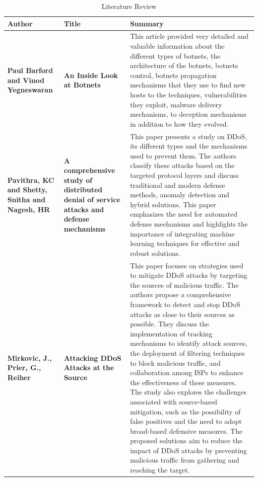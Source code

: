 \documentclass[a4paper, 12pt]{report} %
\begin{document}
            \begin{spacing}{1}
                \begin{table}
                    \centering
                    \label{tab:litterature_review}
                    \caption{Literature Review}
                    \begin{tabularx}{\linewidth}{|p{2cm}|p{3cm}|X|}
                        \hline
                        \textbf{Author} & \textbf{Title} & \textbf{Summary} \\
                        \hline
                        \textbf{Paul Barford and Vinod Yegneswaran} & \textbf{An Inside Look at Botnets} \cite{10.1007/978-0-387-44599-1_8} & This article provided very detailed and valuable information about the different types of botnets, the architecture of the botnets, botnets control, botnets propagation mechanisms that they use to find new hosts to the techniques, vulnerabilities they exploit, malware delivery mechanisms, to deception mechanisms in addition to how they evolved.\\
                        \hline
                        \textbf{Pavithra, KC and Shetty, Snitha and Nagesh, HR} & \textbf{A comprehensive study of distributed denial of service attacks and defense mechanisms} \cite{pavithra2014comprehensive} & This paper presents a study on DDoS, its different types and the mechanisms used to prevent them. The authors classify these attacks based on the targeted protocol layers and discuss traditional and modern defense methods, anomaly detection and hybrid solutions. This paper emphasizes the need for automated defense mechanisms and highlights the importance of integrating machine learning techniques for effective and robust solutions. \\
                        \hline
                        \textbf{Mirkovic, J., Prier, G., Reiher} & \textbf{Attacking DDoS Attacks at the Source} \cite{1181418} & This paper focuses on strategies used to mitigate DDoS attacks by targeting the sources of malicious traffic. The authors propose a comprehensive framework to detect and stop DDoS attacks as close to their sources as possible. They discuss the implementation of tracking mechanisms to identify attack sources, the deployment of filtering techniques to block malicious traffic, and collaboration among ISPs to enhance the effectiveness of these measures. The study also explores the challenges associated with source-based mitigation, such as the possibility of false positives and the need to adopt broad-based defensive measures. The proposed solutions aim to reduce the impact of DDoS attacks by preventing malicious traffic from gathering and reaching the target. \\
                        \hline
                    \end{tabularx}
                \end{table}
            \end{spacing}
\end{document}

